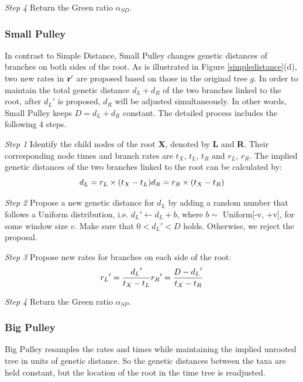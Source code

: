 \documentclass{bmcart}
\begin{document}
\emph{Step 4} Return the Green ratio ${\alpha_{SD}}$.
\subsubsection*{Small Pulley}
In contrast to Simple Distance, Small Pulley changes genetic distances of branches on both sides of the root. As is illustrated in Figure \ref{simpledistance}(d), two new rates in $\bf{r}'$ are proposed based on those in the original tree $g$. In order to maintain the total genetic distance $d_L + d_R$ of the two branches linked to the root, after ${d_L}'$ is proposed, $d_R$ will be adjusted simultaneously. In other words, Small Pulley keeps $D = d_L + d_R$ constant. The detailed process includes the following 4 steps.

\emph{Step 1} Identify the child nodes of the root \textbf{X}, denoted by \textbf{L} and \textbf{R}. Their corresponding node times and branch rates are $t_X$, $t_L$, $t_R$ and $r_L$, $r_R$. The implied genetic distances of the two branches linked to the root can be calculated by:
\begin{equation}
\label{sma1_dis}
{d_L} = {r_L} \times ({{t_X} - {t_L}})\\
{d_R} = {r_R} \times ({{t_X} - {t_R}})
 \end{equation}

\emph{Step 2} Propose a new genetic distance for $d_L$ by adding a random number that follows a Uniform distribution, i.e.  ${d_L}' \leftarrow {d_L} + b$, where $b \sim$ Uniform[-v, +v], for some window size $v$. Make sure that $0 < {d_L}' < D$ holds. Otherwise, we reject the proposal.

\emph{Step 3} Propose new rates for branches on each side of the root:
\begin{equation}
\label{sma1_rate}
{r_L}' = \frac{{{d_L}'}}{{{t_X} - {t_L}}}\\
{r_R}' = \frac{{D - {d_L}'}}{{{t_X} - {t_R}}}
 \end{equation}

\emph{Step 4} Return the Green ratio ${\alpha_{SP}}$.
\subsubsection*{Big Pulley}
Big Pulley resamples the rates and times while maintaining the implied unrooted tree in units of genetic distance. So the genetic distances between the taxa are held constant, but the location of the root in the time tree is readjusted.
\end{document}
